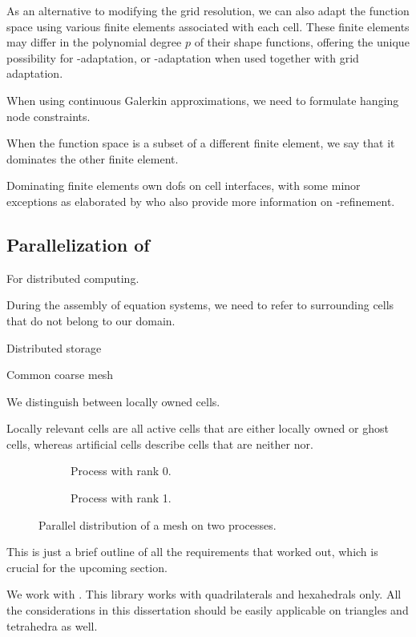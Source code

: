 As an alternative to modifying the grid resolution, we can also adapt the function space using various finite elements associated with each cell. These finite elements may differ in the polynomial degree $p$ of their shape functions, offering the unique possibility for \p-adaptation, or \hp-adaptation when used together with grid adaptation.

When using continuous Galerkin approximations, we need to formulate hanging node constraints.

When the function space is a subset of a different finite element, we say that it dominates the other finite element.

Dominating finite elements own \glspl{dof} on cell interfaces, with some minor exceptions as elaborated by \textcite{bangerth2009} who also provide more information on \hp-refinement.


\subsection{Parallelization of }

For distributed computing.

During the assembly of equation systems, we need to refer to surrounding cells that do not belong to our domain.

Distributed storage

Common coarse mesh

We distinguish between locally owned cells.

Locally relevant cells are all active cells that are either locally owned or ghost cells, whereas artificial cells describe cells that are neither nor.

\begin{figure}
\begin{subfigure}{.5\textwidth}
  \centering
  
  \caption{Process with rank 0.}
\end{subfigure}
\begin{subfigure}{.5\textwidth}
  \centering
  
  \caption{Process with rank 1.}
\end{subfigure}
\caption{Parallel distribution of a mesh on two processes.}
\label{fig:paralleldistribution}
\end{figure}

This is just a brief outline of all the requirements that \textcite{bangerth2012} worked out, which is crucial for the upcoming section.

We work with \dealii{}. This library works with quadrilaterals and hexahedrals only. All the considerations in this dissertation should be easily applicable on triangles and tetrahedra as well.